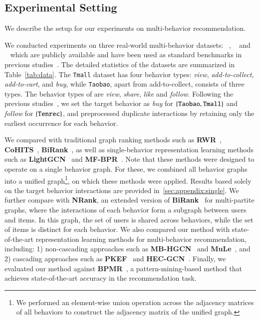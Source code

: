 \subsection{Experimental Setting}
\label{sec:exp:setting}
We describe the setup for our experiments on multi-behavior recommendation.

We conducted experiments on three real-world multi-behavior datasets:  
\taobao~\cite{MengZGGLZZTLZ23, LeeLKSJ24xxaw}, \tenrec~\cite{abs-2210-10629, ZhangBCSYGWHH24} and \tmall~\cite{YanCGSLSL24, MengZGGLZZTLZ23} which are publicly available and have been used as standard benchmarks in previous studies~\cite{LeeLKSJ24xxaw, MengZGGLZZTLZ23, YanCGSLSL24, ZhangBCSYGWHH24, YanYCSSP23}.
The detailed statistics of the datasets are summarized in Table~\ref{tab:data}.
%
The \texttt{Tmall} dataset has four behavior types: \textit{view}, \textit{add-to-collect}, \textit{add-to-cart}, and \textit{buy}, while \texttt{Taobao}, apart from add-to-collect, consists of three types.
The behavior types of \tenrec are \textit{view}, \textit{share}, \textit{like} and \textit{follow}.
Following the previous studies~\cite{LeeLKSJ24xxaw, MengZGGLZZTLZ23, ZhangBCSYGWHH24}, we set the target behavior as \textit{buy} for $\{\texttt{Taobao}, \texttt{Tmall}\}$ and \textit{follow} for $\{\texttt{Tenrec}\}$, and preprocessed duplicate interactions by retaining only the earliest occurrence for each behavior.

We compared \method with traditional graph ranking methods such as \textbf{RWR}~\cite{TianJ13}, \textbf{CoHITS}~\cite{DengDLK09kqpg}, \textbf{BiRank}~\cite{HeHGKW17}, as well as single-behavior representation learning methods such as \textbf{LightGCN}~\cite{HeHDWLZW20} and \textbf{MF-BPR}~\cite{RendleRFGS12}.
Note that these methods were designed to operate on a single behavior graph. 
For these, we combined all behavior graphs into a unified graph\footnote{We performed an element-wise union operation across the adjacency matrices of all behaviors to construct the adjacency matrix of the unified graph.}, on which these methods were applied. 
Results based solely on the target behavior interactions are provided in~\ref{sec:appendix:single}.
We further compare \method with \textbf{NRank}, an extended version of \textbf{BiRank}~\cite{HeHGKW17} for multi-partite graphs, where the interactions of each behavior form a subgraph between users and items. In this graph, the set of users is shared across behaviors, while the set of items is distinct for each behavior.
We also compared our method with state-of-the-art representation learning methods for multi-behavior recommendation, including: 1) non-cascading approaches such as \textbf{MB-HGCN}~\cite{YanYCSSP23} and \textbf{MuLe}~\cite{LeeLKSJ24xxaw}, and 2) cascading approaches such as \textbf{PKEF}~\cite{MengMZYZL23} and \textbf{HEC-GCN}~\cite{yin2024hecgcn}.
Finally, we evaluated our method against \textbf{BPMR}~\cite{LiLCYLLD24}, a pattern-mining-based method that achieves state-of-the-art accuracy in the recommendation task.


